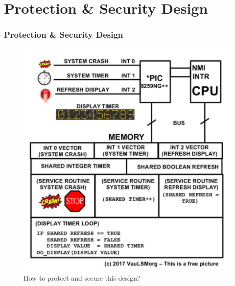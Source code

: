 \documentclass[aspectratio=169, xcolor=table, notheorems, hyperref={pdfpagelabels=false}]{beamer}
\begin{document}
\section{Protection \& Security Design}
\begin{frame}[fragile]
\frametitle{Protection \& Security Design}

\begin{figure}
\includegraphics[width=0.40\linewidth]{os00-int-protection}
\caption{How to protect and secure this design?}
\end{figure}

\end{frame}

\end{document}
